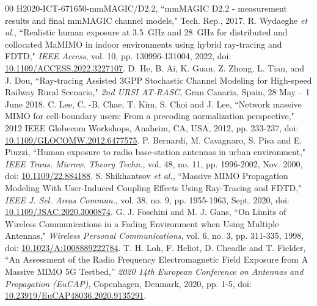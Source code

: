 \documentclass{IEEEtran}
\newcommand*{\doi}[1]{\href{http://dx.doi.org/#1}{#1}}
\begin{document}
\begin{thebibliography}{00}
 H2020-ICT-671650-mmMAGIC/D2.2, ``mmMAGIC D2.2 - measurement results and final mmMAGIC channel models," Tech. Rep., 2017.
 R. Wydaeghe \textit{et al.}, ``Realistic human exposure at 3.5~GHz and 28~GHz for distributed and collocated MaMIMO in indoor environments using hybrid ray-tracing and FDTD," \textit{IEEE Access}, vol. 10, pp. 130996-131004, 2022, doi: \doi{10.1109/ACCESS.2022.3227107}.
 D. He, B. Ai, K. Guan, Z. Zhong, L. Tian, and J. Dou, ``Ray-tracing Assisted 3GPP Stochastic Channel Modeling for High-speed Railway Rural Scenario," \textit{2nd URSI AT-RASC}, Gran Canaria, Spain, 28 May – 1 June 2018.
 C. Lee, C. -B. Chae, T. Kim, S. Choi and J. Lee, ``Network massive MIMO for cell-boundary users: From a precoding normalization perspective," 2012 IEEE Globecom Workshops, Anaheim, CA, USA, 2012, pp. 233-237, doi: \doi{10.1109/GLOCOMW.2012.6477575}. 
 P. Bernardi, M. Cavagnaro, S. Pisa and E. Piuzzi, ``Human exposure to radio base-station antennas in urban environment," \textit{IEEE Trans. Microw. Theory Techn.}, vol. 48, no. 11, pp. 1996-2002, Nov. 2000, doi: \doi{10.1109/22.884188}.
 S. Shikhantsov \textit{et al.}, ``Massive MIMO Propagation Modeling With User-Induced Coupling Effects Using Ray-Tracing and FDTD," \textit{IEEE J. Sel. Areas Commun.}, vol. 38, no. 9, pp. 1955-1963, Sept. 2020, doi: \doi{10.1109/JSAC.2020.3000874}.
 G. J. Foschini and M. J. Gans, ``On Limits of Wireless Communications in a Fading Environment when Using Multiple Antennas," \textit{Wireless Personal Communications}, vol. 6, no. 3, pp. 311-335, 1998, doi: \doi{10.1023/A:1008889222784}.
 T. H. Loh, F. Heliot, D. Cheadle and T. Fielder, ``An Assessment of the Radio Frequency Electromagnetic Field Exposure from A Massive MIMO 5G Testbed,'' \textit{2020 14th European Conference on Antennas and Propagation (EuCAP)}, Copenhagen, Denmark, 2020, pp. 1-5, doi: \doi{10.23919/EuCAP48036.2020.9135291}.

\end{thebibliography}
\end{document}
